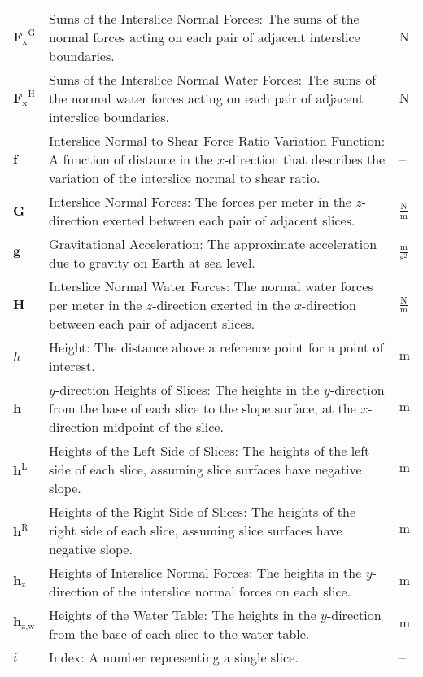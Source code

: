 \documentclass[12pt]{article}
\begin{document}
\begin{longtabu}{l X[l] l}
\\
${{\symbf{F}_{\text{x}}}^{\text{G}}}$ & Sums of the Interslice Normal Forces: The sums of the normal forces acting on each pair of adjacent interslice boundaries. & ${\text{N}}$
\\
${{\symbf{F}_{\text{x}}}^{\text{H}}}$ & Sums of the Interslice Normal Water Forces: The sums of the normal water forces acting on each pair of adjacent interslice boundaries. & ${\text{N}}$
\\
$\symbf{f}$ & Interslice Normal to Shear Force Ratio Variation Function: A function of distance in the $x$-direction that describes the variation of the interslice normal to shear ratio. & --
\\
$\symbf{G}$ & Interslice Normal Forces: The forces per meter in the $z$-direction exerted between each pair of adjacent slices. & $\frac{\text{N}}{\text{m}}$
\\
$\symbf{g}$ & Gravitational Acceleration: The approximate acceleration due to gravity on Earth at sea level. & $\frac{\text{m}}{\text{s}^{2}}$
\\
$\symbf{H}$ & Interslice Normal Water Forces: The normal water forces per meter in the $z$-direction exerted in the $x$-direction between each pair of adjacent slices. & $\frac{\text{N}}{\text{m}}$
\\
$h$ & Height: The distance above a reference point for a point of interest. & ${\text{m}}$
\\
$\symbf{h}$ & $y$-direction Heights of Slices: The heights in the $y$-direction from the base of each slice to the slope surface, at the $x$-direction midpoint of the slice. & ${\text{m}}$
\\
${\symbf{h}^{\text{L}}}$ & Heights of the Left Side of Slices: The heights of the left side of each slice, assuming slice surfaces have negative slope. & ${\text{m}}$
\\
${\symbf{h}^{\text{R}}}$ & Heights of the Right Side of Slices: The heights of the right side of each slice, assuming slice surfaces have negative slope. & ${\text{m}}$
\\
${\symbf{h}_{\text{z}}}$ & Heights of Interslice Normal Forces: The heights in the $y$-direction of the interslice normal forces on each slice. & ${\text{m}}$
\\
${\symbf{h}_{\text{z,w}}}$ & Heights of the Water Table: The heights in the $y$-direction from the base of each slice to the water table. & ${\text{m}}$
\\
$i$ & Index: A number representing a single slice. & --

\end{longtabu}
\end{document}
